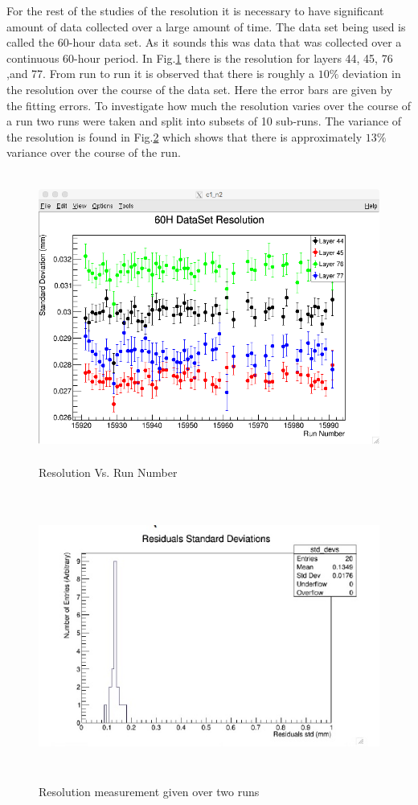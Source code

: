 \documentclass[./Thesis]{subfiles}
\begin{document}
	For the rest of the studies of the resolution it is necessary to have significant amount of data collected over a large amount of time.  The data set being used is called the 60-hour data set.  As it sounds this was data that was collected over a continuous 60-hour period.  In Fig.\ref{fig:ResNum} there is the resolution for layers 44, 45, 76 ,and 77. From run to run it is observed that there is roughly a $10\%$ deviation in the resolution over the course of the data set. Here the error bars are given by the fitting errors.  To investigate how much the resolution varies over the course of a run two runs were taken and split into subsets of 10 sub-runs.  The variance of the resolution is found in Fig.\ref{fig:ResRun} which shows that there is approximately $13\%$ variance over the course of the run.
	
	
\begin{figure}
	\centerline{\includegraphics[height=95mm]{60HDataSetResidual.png}}
	\caption[60H Resolution]{ Resolution Vs. Run Number}
	\label{fig:ResNum}
\end{figure} 


\begin{figure}
	\centerline{\includegraphics[height=95mm]{ResidualsRun.jpeg}}
	\caption[Resolution Over Two Runs]{ Resolution measurement given over two runs}
	\label{fig:ResRun}
\end{figure} 
\end{document}
